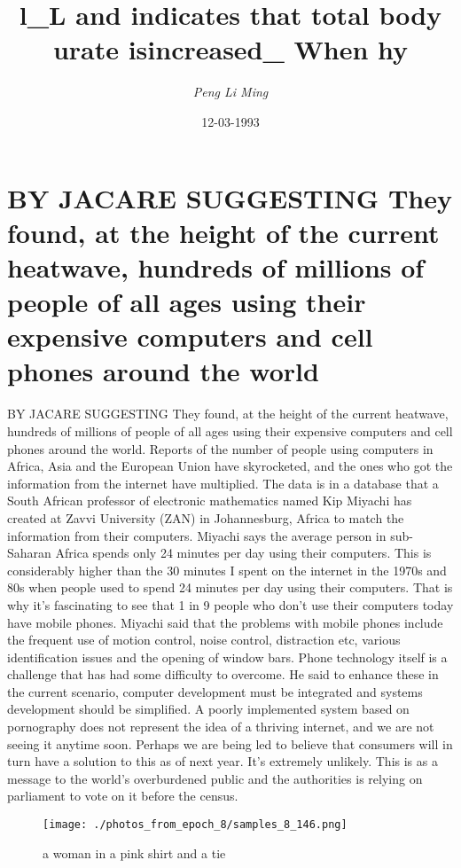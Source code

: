 \documentclass{article}%
\title{l\_L and indicates that total body urate isincreased\_ When hy}%
\author{\textit{Peng Li Ming}}%
\date{12-03-1993}%
\begin{document}
%
\normalsize%
\maketitle%
\section{BY JACARE SUGGESTING\newline%
They found, at the height of the current heatwave, hundreds of millions of people of all ages using their expensive computers and cell phones around the world}%
\label{sec:BYJACARESUGGESTINGTheyfound,attheheightofthecurrentheatwave,hundredsofmillionsofpeopleofallagesusingtheirexpensivecomputersandcellphonesaroundtheworld}%
BY JACARE SUGGESTING\newline%
They found, at the height of the current heatwave, hundreds of millions of people of all ages using their expensive computers and cell phones around the world.\newline%
Reports of the number of people using computers in Africa, Asia and the European Union have skyrocketed, and the ones who got the information from the internet have multiplied.\newline%
The data is in a database that a South African professor of electronic mathematics named Kip Miyachi has created at Zavvi University (ZAN) in Johannesburg, Africa to match the information from their computers.\newline%
Miyachi says the average person in sub{-}Saharan Africa spends only 24 minutes per day using their computers. This is considerably higher than the 30 minutes I spent on the internet in the 1970s and 80s when people used to spend 24 minutes per day using their computers.\newline%
That is why it’s fascinating to see that 1 in 9 people who don’t use their computers today have mobile phones.\newline%
Miyachi said that the problems with mobile phones include the frequent use of motion control, noise control, distraction etc, various identification issues and the opening of window bars.\newline%
Phone technology itself is a challenge that has had some difficulty to overcome. He said to enhance these in the current scenario, computer development must be integrated and systems development should be simplified.\newline%
A poorly implemented system based on pornography does not represent the idea of a thriving internet, and we are not seeing it anytime soon.\newline%
Perhaps we are being led to believe that consumers will in turn have a solution to this as of next year.\newline%
It’s extremely unlikely. This is as a message to the world’s overburdened public and the authorities is relying on parliament to vote on it before the census.\newline%

%


\begin{figure}[h!]%
\centering%
\texttt{[image: ./photos\_from\_epoch\_8/samples\_8\_146.png]}%
\caption{a woman in a pink shirt and a tie}%
\end{figure}

%
\end{document}
